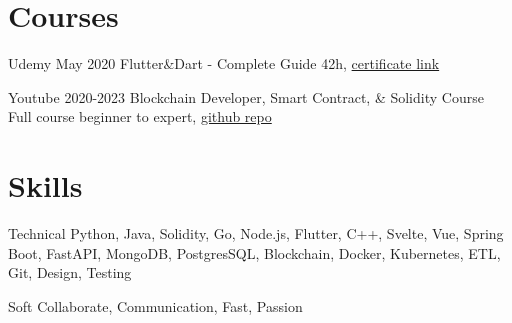 \documentclass{tccv}
\begin{document}
\section{Courses}

\begin{yearlist}

\item[Udemy]{May 2020}
     {Flutter\&Dart - Complete Guide}
     {42h, \href{https://www.udemy.com/certificate/UC-c6f5a32f-babc-42f9-8a0a-6effadf9e7cd/}{certificate link}}

\item[Youtube]{2020-2023}
    {Blockchain Developer, Smart Contract, \& Solidity Course}
    {Full course beginner to expert, \href{https://github.com/Cyfrin/foundry-full-course-f23}{github repo}}

\end{yearlist}


\section{Skills}

\begin{factlist}

\item{Technical}
     {Python, Java, Solidity, Go, Node.js, Flutter, C++, Svelte, Vue, Spring Boot, FastAPI, MongoDB, PostgresSQL, Blockchain, Docker, Kubernetes, ETL, Git, Design, Testing}

\item{Soft}
     {Collaborate, Communication, Fast, Passion}

\end{factlist}
\end{document}
